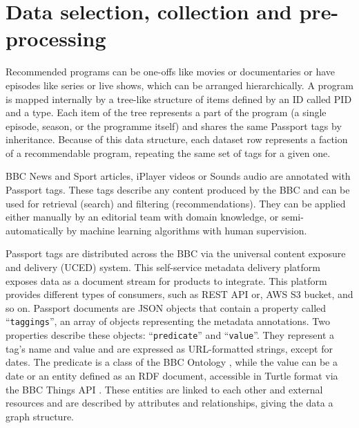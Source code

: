 
\section{Data selection, collection and pre-processing}


Recommended programs can be one-offs like movies or documentaries or have episodes like series or live shows,
which can be arranged hierarchically.
A program is mapped internally by a tree-like structure of items defined by an ID called PID and a type.
Each item of the tree represents a part of the program (a single episode, season, or the programme itself)
and shares the same Passport tags by inheritance.
Because of this data structure, each dataset row represents a faction of a recommendable program,
repeating the same set of tags for a given one.

BBC News and Sport articles, iPlayer videos or Sounds audio are annotated with Passport tags.
These tags describe any content produced by the BBC and can be used for retrieval (search) and filtering (recommendations).
They can be applied either manually by an editorial team with domain knowledge,
or semi-automatically by machine learning algorithms with human supervision.

Passport tags are distributed across the BBC via the universal content exposure and delivery (UCED) system.
This self-service metadata delivery platform exposes data as a document stream for products to integrate.
This platform provides different types of consumers, such as REST API or, AWS S3 bucket, and so on.
Passport documents are JSON objects that contain a property called ``\verb|taggings|'', an array of objects representing the
metadata annotations. Two properties describe these objects: ``\verb|predicate|'' and ``\verb|value|''.
They represent a tag's name and value and are expressed as URL-formatted strings, except for dates.
The predicate is a class of the BBC Ontology \cite{BBC:Ontologies},
while the value can be a date or an entity defined as an RDF \cite{W3C:RDF,W3C:RDF:Concepts} document,
accessible in Turtle format \cite{W3C:Turtle} via the BBC Things API \cite{BBC:Things,BBC:Things:About,BBC:Things:API}.
These entities are linked to each other and external resources and are described by attributes and relationships,
giving the data a graph structure.

